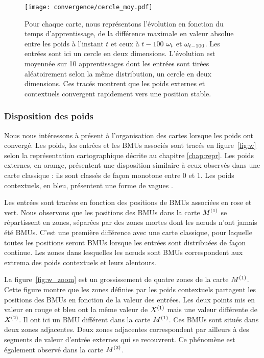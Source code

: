 \documentclass[../main]{subfiles}
\begin{document}
\begin{figure}
	\texttt{[image: convergence/cercle\_moy.pdf]}
	\caption{Pour chaque carte, nous représentons l'évolution en fonction du temps d'apprentissage, de la différence maximale en valeur absolue entre les poids à l'instant $t$ et ceux à $t-100$ $\omega_t$ et $\omega_{t-100}$. Les entrées sont ici un cercle en deux dimensions. L'évolution est moyennée sur 10 apprentissages dont les entrées sont tirées aléatoirement selon la même distribution, un cercle en deux dimensions.
	Ces tracés montrent que les poids externes et contextuels convergent rapidement vers une position stable.\label{fig:conv}}
\end{figure}


\subsubsection{Disposition des poids}

Nous nous intéressons à présent à l'organisation des cartes lorsque les poids ont convergé.
Les poids, les entrées et les BMUs associés sont tracés en figure~\ref{fig:w} selon la représentation cartographique décrite au chapitre \ref{chap:repr}.
Les poids externes, en orange, présentent une disposition similaire à ceux observés dans une carte classique : ils sont classés de façon monotone entre 0 et 1.
Les poids contextuels, en bleu, présentent une forme de \og vagues \fg{}. 

Les entrées sont tracées en fonction des positions de BMUs associées en rose et vert. 
Nous observons que les positions des BMUs dans la carte $M^{({1})}$ se répartissent en zones, séparées par des zones mortes dont les n\oe{}uds n'ont jamais été BMUs.
C'est une première différence avec une carte classique, pour laquelle toutes les positions seront BMUs lorsque les entrées sont distribuées de façon continue.
Les zones dans lesquelles les n\oe{}uds sont BMUs correspondent aux extrema des poids contextuels et leurs alentours.

La figure~\ref{fig:w_zoom} est un grossissement de quatre zones de la carte $M^{({1})}$.
Cette figure montre que les zones définies par les poids contextuels partagent les positions des BMUs en fonction de la valeur des entrées. 
Les deux points mis en valeur en rouge et bleu ont la même valeur de $X^{({1})}$ mais une valeur différente de $X^{({2})}$. Il ont ici un BMU différent dans la carte $M^{({1})}$. Ces BMUs sont situés dans deux zones adjacentes.
Deux zones adjacentes correspondent par ailleurs à des segments de valeur d'entrée externes qui se recouvrent.
Ce phénomène est également observé dans la carte $M^{({2})}$.
\end{document}
